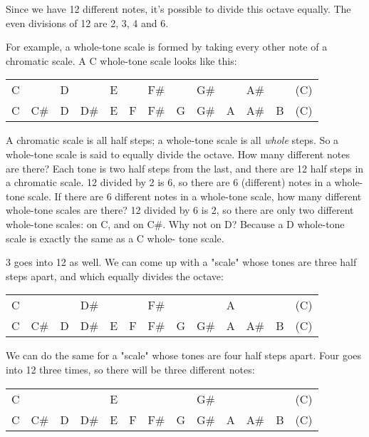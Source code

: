 Since we have 12 different notes, it's possible to divide this octave equally.
The even divisions of 12 are 2, 3, 4 and 6.

For example, a whole-tone scale is formed by taking every other note of a
chromatic scale. A C whole-tone scale looks like this:

\begin{center}
\begin{tabular}{ l l l l l l l l l l l l l }
	C &     & D &     & E &   & F\# &   & G\# &   & A\# &   & (C)\\
	C & C\# & D & D\# & E & F & F\# & G & G\# & A & A\# & B & (C)\\
\end{tabular}
\end{center}

A chromatic scale is all half steps; a whole-tone scale is all \emph{whole} steps.
So a whole-tone scale is said to equally divide the octave. How many different
notes are there? Each tone is two half steps from the last, and there are 12
half steps in a chromatic scale. 12 divided by 2 is 6, so there are 6
(different) notes in a whole-tone scale. If there are 6 different notes in
a whole-tone scale, how many different whole-tone scales are there? 12 divided
by 6 is 2, so there are only two different whole-tone scales: on C, and on C\#.
Why not on D? Because a D whole-tone scale is exactly the same as a C whole-
tone scale.

3 goes into 12 as well. We can come up with a "scale" whose tones are three
half steps apart, and which equally divides the octave:

\begin{center}
\begin{tabular}{ l l l l l l l l l l l l l }
  C &     &   & D\# &   &   & F\# &   &     & A &     &   & (C)\\
  C & C\# & D & D\# & E & F & F\# & G & G\# & A & A\# & B & (C)\\
\end{tabular}
\end{center}

We can do the same for a "scale" whose tones are four half steps apart. Four
goes into 12 three times, so there will be three different notes:

\begin{center}
\begin{tabular}{ l l l l l l l l l l l l l }
  C &     &   &     & E &   &     &   & G\# &   &     &   & (C)\\
  C & C\# & D & D\# & E & F & F\# & G & G\# & A & A\# & B & (C)\\
\end{tabular}
\end{center}

